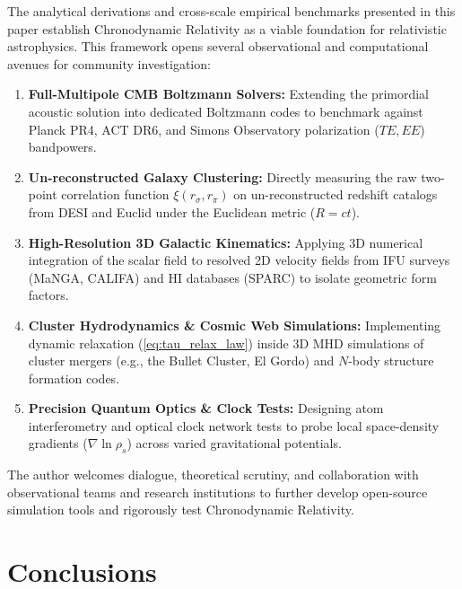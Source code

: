 \documentclass[aps,prd,reprint,superscriptaddress,nofootinbib,floatfix,amsmath,amssymb]{revtex4-2}
\begin{document}
The analytical derivations and cross-scale empirical benchmarks presented in this paper establish Chronodynamic Relativity as a viable foundation for relativistic astrophysics. This framework opens several observational and computational avenues for community investigation:

\begin{enumerate}
    \item \textbf{Full-Multipole CMB Boltzmann Solvers:} Extending the primordial acoustic solution into dedicated Boltzmann codes to benchmark against Planck PR4, ACT DR6, and Simons Observatory polarization ($TE, EE$) bandpowers.
    \item \textbf{Un-reconstructed Galaxy Clustering:} Directly measuring the raw two-point correlation function $\xi(r_\sigma, r_\pi)$ on un-reconstructed redshift catalogs from DESI and Euclid under the Euclidean metric ($R = c t$).
    \item \textbf{High-Resolution 3D Galactic Kinematics:} Applying 3D numerical integration of the scalar field to resolved 2D velocity fields from IFU surveys (MaNGA, CALIFA) and HI databases (SPARC) to isolate geometric form factors.
    \item \textbf{Cluster Hydrodynamics \& Cosmic Web Simulations:} Implementing dynamic relaxation (\ref{eq:tau_relax_law}) inside 3D MHD simulations of cluster mergers (e.g., the Bullet Cluster, El Gordo) and $N$-body structure formation codes.
    \item \textbf{Precision Quantum Optics \& Clock Tests:} Designing atom interferometry and optical clock network tests to probe local space-density gradients ($\nabla\ln\rho_s$) across varied gravitational potentials.
\end{enumerate}

The author welcomes dialogue, theoretical scrutiny, and collaboration with observational teams and research institutions to further develop open-source simulation tools and rigorously test Chronodynamic Relativity.

\section{Conclusions}
\label{sec:conclusions}
\end{document}
